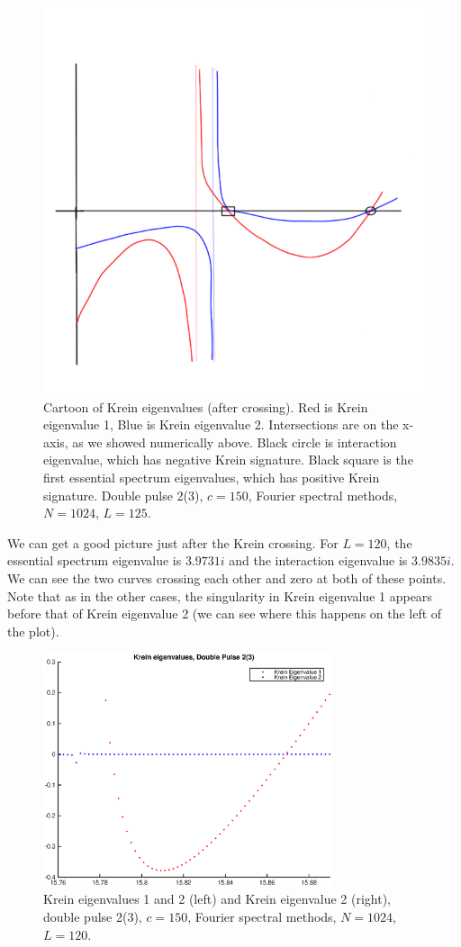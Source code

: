 \documentclass[12pt]{article}
\begin{document}
\begin{figure}[H]
	\includegraphics[width=15cm]{kreincartoonaftercrossing.png}
	\caption{Cartoon of Krein eigenvalues (after crossing). Red is Krein eigenvalue 1, Blue is Krein eigenvalue 2. Intersections are on the x-axis, as we showed numerically above. Black circle is interaction eigenvalue, which has negative Krein signature. Black square is the first essential spectrum eigenvalues, which has positive Krein signature. Double pulse 2(3), $c = 150$, Fourier spectral methods, $N = 1024$, $L = 125$.}
\end{figure}

We can get a good picture just after the Krein crossing. For $L = 120$, the essential spectrum eigenvalue is $3.9731i$ and the interaction eigenvalue is $3.9835i$. We can see the two curves crossing each other and zero at both of these points. Note that as in the other cases, the singularity in Krein eigenvalue 1 appears before that of Krein eigenvalue 2 (we can see where this happens on the left of the plot).

\begin{figure}[H]
	\includegraphics[width=8.5cm]{1500F_dp2_120_krein1.eps}
	\caption{Krein eigenvalues 1 and 2 (left) and Krein eigenvalue 2 (right), double pulse 2(3), $c = 150$, Fourier spectral methods, $N = 1024$, $L = 120$. }
\end{figure}
\end{document}
